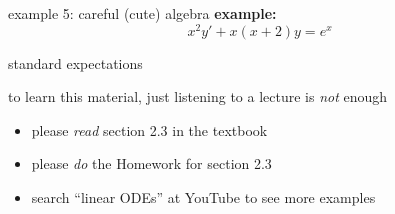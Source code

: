 \documentclass{beamer}
\begin{document}
\begin{frame}{example 5: careful (cute) algebra}
\textbf{example:}
        $$x^2 y' + x(x+2) y = e^x$$

\vspace{60mm}
\end{frame}



\begin{frame}{standard expectations}

to learn this material, just listening to a lecture is \emph{not} enough
\begin{itemize}
\item please \emph{read} section 2.3 in the textbook
\item please \emph{do} the Homework for section 2.3
\item search ``linear ODEs'' at YouTube to see more examples
\end{itemize}
\end{frame}
\end{document}
